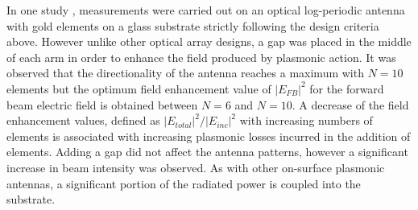 \documentclass[11pt]{article}
\begin{document}
In one study \cite{Pavlov2012}, measurements were carried out on an optical log-periodic antenna with gold elements on a glass substrate strictly following the design criteria above. However unlike other optical array designs, a gap was placed in the middle of each arm in order to enhance the field produced by plasmonic action. It was observed that the directionality of the antenna reaches a maximum with $N = 10$ elements but the optimum field enhancement value of $|E_{FB}|^2$ for the forward beam electric field is obtained between $N = 6$ and $N = 10$. A decrease of the field enhancement values, defined as $|E_{total}|^2/|E_{inc}|^2$ with increasing numbers of elements is associated with increasing plasmonic losses incurred in the addition of elements. Adding a gap did not affect the antenna patterns, however a significant increase in beam intensity was observed. As with other on-surface plasmonic antennas, a significant portion of the radiated power is coupled into the substrate.
\end{document}
